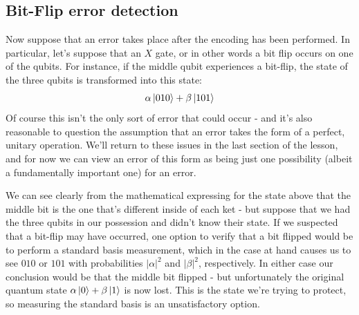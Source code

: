 \documentclass[12pt, oneside]{book}
\theoremstyle{definition}
\theoremstyle{definition}
\theoremstyle{remark}
\begin{document}
\subsection{Bit-Flip error detection}
Now suppose that an error takes place after the encoding has been performed. In particular, let's suppose that an $X$ gate, or in other words a bit flip occurs on one of the qubits. For instance, if the middle qubit experiences a bit-flip, the state of the three qubits is transformed into this state:
\[
\alpha\ket{010}+\beta\ket{101}
\]
Of course this isn't the only sort of error that could occur - and it's also reasonable to question the assumption that an error takes the form of a perfect, unitary operation. We'll return to these issues in the last section of the lesson, and for now we can view an error of this form as being just one possibility (albeit a fundamentally important one) for an error.

We can see clearly from the mathematical expressing for the state above that the middle bit is the one that's different inside of each ket - but suppose that we had the three qubits in our possession and didn't know their state. If we suspected that a bit-flip may have occurred, one option to verify that a bit flipped would be to perform a standard basis measurement, which in the case at hand causes us to see $010$ or $101$ with probabilities $|\alpha|^2$ and $|\beta|^2$, respectively. In either case our conclusion would be that the middle bit flipped - but unfortunately the original quantum state $\alpha\ket{0}+\beta\ket{1}$ is now lost. This is the state we're trying to protect, so measuring the standard basis is an unsatisfactory option.
\end{document}
